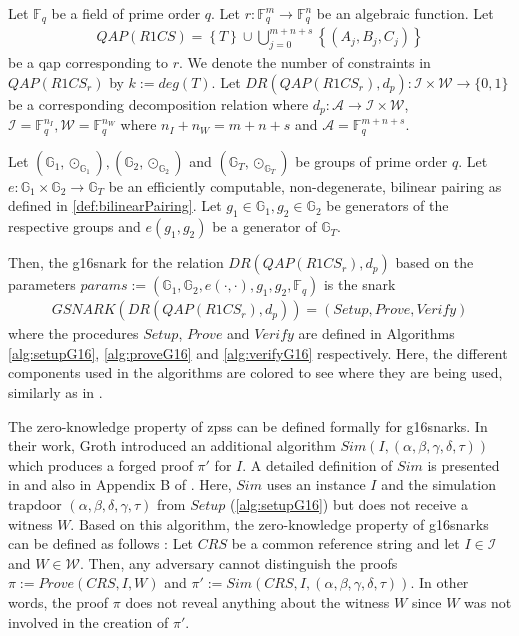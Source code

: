 \begin{definition}
    Let $\mathbb{F}_q$ be a field of prime order $q$.
    Let $r:\mathbb{F}_q^m\to\mathbb{F}_q^n$ be an algebraic function.
    Let 
    \begin{align*}
        QAP(R1CS)=\left\{T\right\}\cup \bigcup_{j=0}^{m+n+s}\left\{\left(A_j, B_j, C_j\right)\right\}
    \end{align*}
    be a \gls{qap} corresponding to $r$.
    We denote the number of constraints in $QAP(R1CS_r)$ by $k:=deg(T)$.
    Let $DR(QAP(R1CS_r), d_p):\mathcal{I}\times\mathcal{W}\to\{0,1\}$ be a corresponding decomposition relation where $d_p:\mathcal{A}\to\mathcal{I}\times\mathcal{W}$, $\mathcal{I}=\mathbb{F}_q^{n_I}, \mathcal{W}=\mathbb{F}_q^{n_W}$ where $n_I + n_W=m+n+s$ and $\mathcal{A}=\mathbb{F}_q^{m+n+s}$.

    Let $(\mathbb{G}_1, \odot_{\mathbb{G}_1}), (\mathbb{G}_2, \odot_{\mathbb{G}_2})$ and $(\mathbb{G}_T, \odot_{\mathbb{G}_T})$ be groups of prime order $q$.
    Let $e:\mathbb{G}_1\times\mathbb{G}_2\to\mathbb{G}_T$ be an efficiently computable, non-degenerate, bilinear pairing as defined in \cref{def:bilinearPairing}.
    Let $g_1\in\mathbb{G}_1, g_2\in\mathbb{G}_2$ be generators of the respective groups and $e(g_1, g_2)$ be a generator of $\mathbb{G}_T$.

    Then, the \gls{g16snark} for the relation $DR(QAP(R1CS_r), d_p)$ based on the parameters $params:=(\mathbb{G}_1, \mathbb{G}_2, e(\cdot,\cdot),g_1,g_2,\mathbb{F}_q)$ is the \gls{snark}
    \begin{align*}
        GSNARK(DR(QAP(R1CS_r), d_p))=(Setup, Prove, Verify)
    \end{align*}
    where the procedures $Setup$, $Prove$ and $Verify$ are defined in Algorithms \ref{alg:setupG16}, \ref{alg:proveG16} and \ref{alg:verifyG16} respectively.
    Here, the different components used in the algorithms are colored to see where they are being used, similarly as in \cite{huber_zk-snarks_2025}.
\end{definition}

The zero-knowledge property of \glspl{zps} can be defined formally for \glspl{g16snark}.
In their work, Groth \cite{groth_size_2016} introduced an additional algorithm $Sim(I, (\alpha,\beta,\gamma,\delta,\tau))$ which produces a forged proof $\pi'$ for $I$.
A detailed definition of $Sim$ is presented in \cite{groth_size_2016} and also in Appendix B of \cite{huber_zk-snarks_2025}.
Here, $Sim$ uses an instance $I$ and the simulation trapdoor $(\alpha, \beta, \delta, \gamma, \tau)$ from $Setup$ (\cref{alg:setupG16}) but does not receive a witness $W$.
Based on this algorithm, the zero-knowledge property of \glspl{g16snark} can be defined as follows \cite{groth_size_2016}:
Let $CRS$ be a common reference string and let $I\in\mathcal{I}$ and $W\in\mathcal{W}$. %
Then, any adversary cannot distinguish the proofs $\pi:=Prove(CRS, I, W)$ and $\pi':=Sim(CRS, I, (\alpha, \beta, \gamma, \delta, \tau))$.
In other words, the proof $\pi$ does not reveal anything about the witness $W$ since $W$ was not involved in the creation of $\pi'$.

